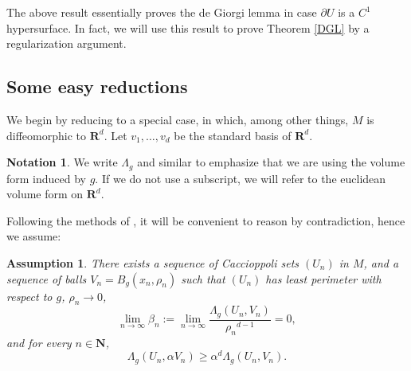 \documentclass[reqno,12pt,letterpaper]{amsart}
\newcommand{\NN}{\mathbf{N}}
\newcommand{\RR}{\mathbf{R}}
\newtheorem{assumption}[theorem]{Assumption}
\theoremstyle{definition}
\newtheorem{notation}[theorem]{Notation}
\numberwithin{equation}{section}
\begin{document}
The above result essentially proves the de Giorgi lemma in case $\partial U$ is a $C^1$ hypersurface.
In fact, we will use this result to prove Theorem \ref{DGL} by a regularization argument.

\subsection{Some easy reductions}
We begin by reducing to a special case, in which, among other things, $M$ is diffeomorphic to $\RR^d$.
Let $v_1, \dots, v_d$ be the standard basis of $\RR^d$.

\begin{notation}
We write $\Lambda_g$ and similar to emphasize that we are using the volume form induced by $g$.
If we do not use a subscript, we will refer to the euclidean volume form on $\RR^d$.
\end{notation}

Following the methods of \cite[\S4-5]{Miranda66}, it will be convenient to reason by contradiction, hence we assume:

\begin{assumption} \label{DGL contradictor}
There exists a sequence of Caccioppoli sets $(U_n)$ in $M$, and a sequence of balls $V_n = B_g(x_n, \rho_n)$ such that $(U_n)$ has least perimeter with respect to $g$, $\rho_n \to 0$,
$$\lim_{n \to \infty} \beta_n := \lim_{n \to \infty} \frac{\Lambda_g(U_n, V_n)}{{\rho_n}^{d - 1}} = 0,$$
and for every $n \in \NN$,
\begin{equation}\label{contradiction DGL}
\Lambda_g(U_n, \alpha V_n) \geq \alpha^d \Lambda_g(U_n, V_n).
\end{equation}
\end{assumption}
\end{document}
